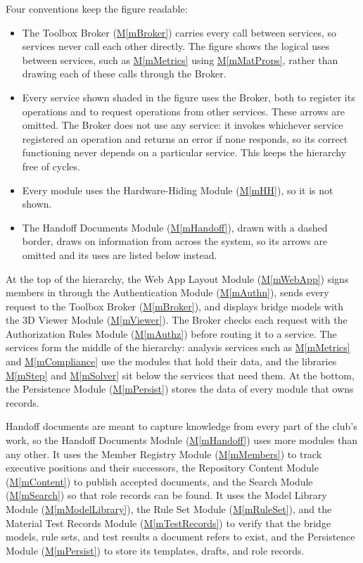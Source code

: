 \documentclass[12pt, titlepage]{article}
\newcommand{\mref}[1]{\hyperref[#1:dec]{M\ref*{#1}}}
\begin{document}
Four conventions keep the figure readable:
\begin{itemize}
\item The Toolbox Broker (\mref{mBroker}) carries every call between services, so services never call each other directly. The figure shows the logical uses between services, such as \mref{mMetrics} using \mref{mMatProps}, rather than drawing each of these calls through the Broker.
\item Every service shown shaded in the figure uses the Broker, both to register its operations and to request operations from other services. These arrows are omitted. The Broker does not use any service: it invokes whichever service registered an operation and returns an error if none responds, so its correct functioning never depends on a particular service. This keeps the hierarchy free of cycles.
\item Every module uses the Hardware-Hiding Module (\mref{mHH}), so it is not shown.
\item The Handoff Documents Module (\mref{mHandoff}), drawn with a dashed border, draws on information from across the system, so its arrows are omitted and its uses are listed below instead.
\end{itemize}

At the top of the hierarchy, the Web App Layout Module (\mref{mWebApp}) signs members in through the Authentication Module (\mref{mAuthn}), sends every request to the Toolbox Broker (\mref{mBroker}), and displays bridge models with the 3D Viewer Module (\mref{mViewer}). The Broker checks each request with the Authorization Rules Module (\mref{mAuthz}) before routing it to a service. The services form the middle of the hierarchy: analysis services such as \mref{mMetrics} and \mref{mCompliance} use the modules that hold their data, and the libraries \mref{mStep} and \mref{mSolver} sit below the services that need them. At the bottom, the Persistence Module (\mref{mPersist}) stores the data of every module that owns records.

Handoff documents are meant to capture knowledge from every part of the club's work, so the Handoff Documents Module (\mref{mHandoff}) uses more modules than any other. It uses the Member Registry Module (\mref{mMembers}) to track executive positions and their successors, the Repository Content Module (\mref{mContent}) to publish accepted documents, and the Search Module (\mref{mSearch}) so that role records can be found. It uses the Model Library Module (\mref{mModelLibrary}), the Rule Set Module (\mref{mRuleSet}), and the Material Test Records Module (\mref{mTestRecords}) to verify that the bridge models, rule sets, and test results a document refers to exist, and the Persistence Module (\mref{mPersist}) to store its templates, drafts, and role records.
\end{document}
